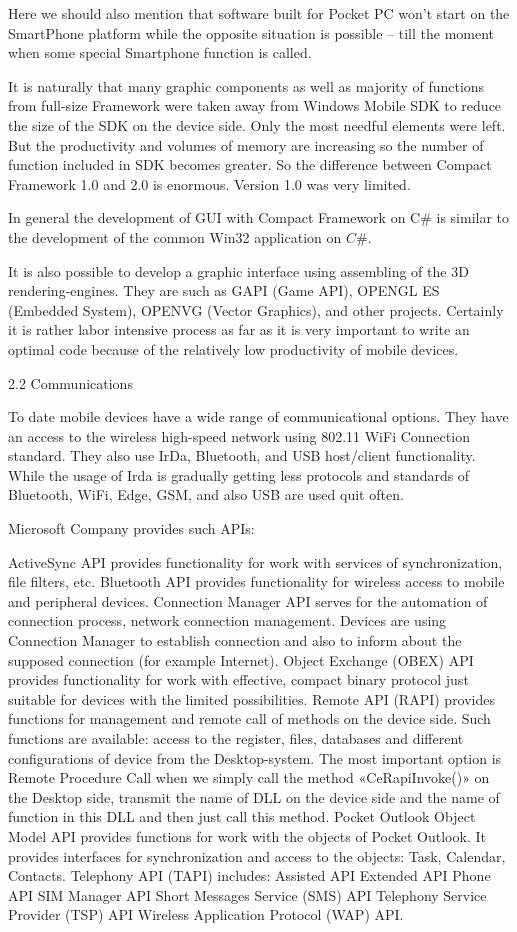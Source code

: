 Here we should also mention that software built for Pocket PC won’t start on the
SmartPhone platform while the opposite situation is possible – till the moment
when some special Smartphone function is called.

It is naturally that many graphic components as well as majority of functions
from full-size Framework were taken away from Windows Mobile SDK to reduce the
size of the SDK on the device side. Only the most needful elements were left. But
the productivity and volumes of memory are increasing so the number of function
included in SDK becomes greater. So the difference between Compact Framework 1.0
and 2.0 is enormous. Version 1.0 was very limited.

In general the development of GUI with Compact Framework on C\# is similar to
the development of the common Win32 application on $C\#$.

It is also possible to develop a graphic interface using assembling of the 3D
rendering-engines. They are such as GAPI (Game API), OPENGL ES (Embedded System),
OPENVG (Vector Graphics), and other projects. Certainly it is rather labor
intensive process as far as it is very important to write an optimal code because
of the relatively low  productivity of mobile devices.

2.2 Communications

To date mobile devices have a wide range of communicational options. They have an
access to the wireless high-speed network using 802.11 WiFi Connection standard.
They also use IrDa, Bluetooth, and USB host/client functionality. While the usage
of Irda is gradually getting less protocols and standards of Bluetooth, WiFi,
Edge, GSM, and also USB are used quit often.

Microsoft Company provides such APIs:

ActiveSync API provides functionality for work with services of synchronization,
file filters, etc. Bluetooth API provides functionality for wireless access to
mobile and peripheral devices. Connection Manager API serves for the automation
of connection process, network connection management. Devices are using
Connection Manager to establish connection and also to inform about the supposed
connection (for example Internet). Object Exchange (OBEX) API provides
functionality for work with effective, compact binary protocol just suitable for
devices with the limited possibilities. Remote API (RAPI) provides functions for
management and remote call of methods on the device side. Such functions are
available: access to the register, files, databases and different configurations
of device from the Desktop-system. The most important option is Remote Procedure
Call when we simply call the method «CeRapiInvoke()» on the Desktop side,
transmit the name of DLL on the device side and the name of function in this DLL
and then just call this method. Pocket Outlook Object Model API provides
functions for work with the objects of Pocket Outlook. It provides interfaces for
synchronization and access to the objects: Task, Calendar, Contacts. Telephony
API (TAPI) includes: Assisted API Extended API Phone API SIM Manager API Short
Messages Service (SMS) API Telephony Service Provider (TSP) API Wireless
Application Protocol (WAP)  API.

